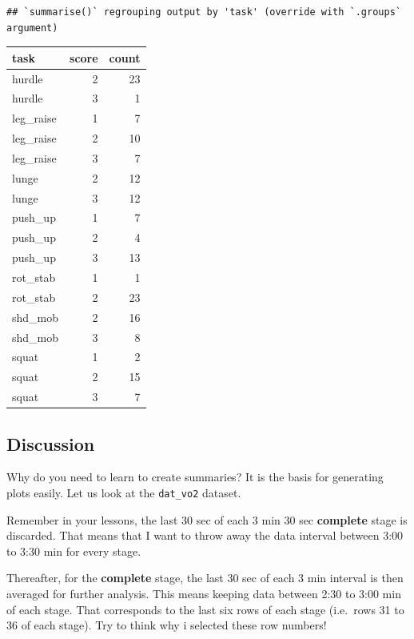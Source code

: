 \documentclass[
]{book}
\begin{document}
\begin{verbatim}
## `summarise()` regrouping output by 'task' (override with `.groups` argument)
\end{verbatim}

\begin{tabular}{l|r|r}
\hline
task & score & count\\
\hline
hurdle & 2 & 23\\
\hline
hurdle & 3 & 1\\
\hline
leg\_raise & 1 & 7\\
\hline
leg\_raise & 2 & 10\\
\hline
leg\_raise & 3 & 7\\
\hline
lunge & 2 & 12\\
\hline
lunge & 3 & 12\\
\hline
push\_up & 1 & 7\\
\hline
push\_up & 2 & 4\\
\hline
push\_up & 3 & 13\\
\hline
rot\_stab & 1 & 1\\
\hline
rot\_stab & 2 & 23\\
\hline
shd\_mob & 2 & 16\\
\hline
shd\_mob & 3 & 8\\
\hline
squat & 1 & 2\\
\hline
squat & 2 & 15\\
\hline
squat & 3 & 7\\
\hline
\end{tabular}

\hypertarget{discussion-6}{%
\subsection{Discussion}\label{discussion-6}}

Why do you need to learn to create summaries? It is the basis for generating plots easily. Let us look at the \texttt{dat\_vo2} dataset.

Remember in your lessons, the last 30 sec of each 3 min 30 sec \textbf{complete} stage is discarded. That means that I want to throw away the data interval between 3:00 to 3:30 min for every stage.

Thereafter, for the \textbf{complete} stage, the last 30 sec of each 3 min interval is then averaged for further analysis. This means keeping data between 2:30 to 3:00 min of each stage. That corresponds to the last six rows of each stage (i.e.~rows 31 to 36 of each stage). Try to think why i selected these row numbers!
\end{document}
